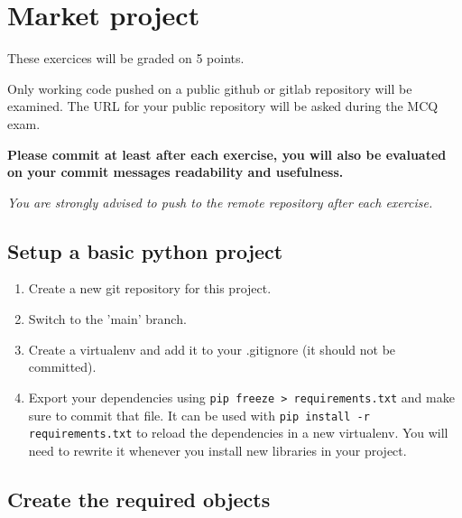 
\setcounter{section}{4}



\section{Market project}

These exercices will be graded on 5 points.

Only working code pushed on a public github or gitlab repository will be examined.
The URL for your public repository will be asked during the MCQ exam.

\textbf{Please commit at least after each exercise, you will also be evaluated on your commit messages readability and usefulness.}

\textit{You are strongly advised to push to the remote repository after each exercise.}

\subsection{Setup a basic python project}

\begin{enumerate}
    \item Create a new git repository for this project.
    \item Switch to the 'main' branch.
    \item Create a virtualenv and add it to your .gitignore (it should not be committed).
    \item Export your dependencies using \verb+pip freeze > requirements.txt+ and make sure to commit that file.
        It can be used with \verb+pip install -r requirements.txt+ to reload the dependencies in a new virtualenv.
        You will need to rewrite it whenever you install new libraries in your project.
\end{enumerate}

\subsection{Create the required objects}


